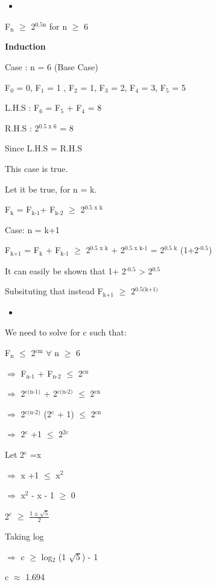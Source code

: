\documentclass{book}
\begin{document}
\section{}
\label{sec:org9c564a7}
\begin{itemize}
\item 
\end{itemize}
\begin{EQUATION}
F\(_{\text{n}}\) \(\ge\) 2\(^{\text{0.5n}}\) for n \(\ge\) 6

\textbf{Induction}

Case : n = 6 (Base Case)

F\(_{\text{0}}\) = 0, F\(_{\text{1}}\) = 1 , F\(_{\text{2}}\) = 1, F\(_{\text{3}}\) = 2, F\(_{\text{4}}\) = 3, F\(_{\text{5}}\) = 5

L.H.S : F\(_{\text{6}}\) = F\(_{\text{5}}\) + F\(_{\text{4}}\) = 8

R.H.S : 2\(^{\text{0.5 x 6}}\) = 8

Since L.H.S = R.H.S

This case is true.

Let it be true, for n = k.

F\(_{\text{k}}\) = F\(_{\text{k-1}}\)+ F\(_{\text{k-2}}\) \(\ge\) 2\(^{\text{0.5 x k}}\)

Case: n = k+1

F\(_{\text{k+1}}\) = F\(_{\text{k}}\) + F\(_{\text{k-1}}\) \(\ge\) 2\(^{\text{0.5 x k}}\) + 2\(^{\text{0.5 x k-1}}\)  = 2\(^{\text{0.5 k}}\) (1+2\(^{\text{-0.5}}\)) 

It can easily be shown that 1+ 2\(^{\text{-0.5}}\) > 2\(^{\text{0.5}}\)

Subsituting that instead
F\(_{\text{k+1}}\) \(\ge\) 2\(^{\text{0.5(k+1)}}\)
\end{EQUATION}
\begin{itemize}
\item 
\end{itemize}
\begin{EQUATION}
We need to solve for c such that:

F\(_{\text{n}}\) \(\le\) 2\(^{\text{cm}}\) \(\forall\) n \(\ge\) 6

\(\Rightarrow\) F\(_{\text{n-1}}\) + F\(_{\text{n-2}}\) \(\le\) 2\(^{\text{cn}}\)

\(\Rightarrow\) 2\(^{\text{c(n-1)}}\) + 2\(^{\text{c(n-2)}}\) \(\le\) 2\(^{\text{cn}}\)

\(\Rightarrow\) 2\(^{\text{c(n-2)}}\) (2\(^{\text{c}}\) + 1) \(\le\) 2\(^{\text{cn}}\)

\(\Rightarrow\) 2\(^{\text{c}}\) +1  \(\le\) 2\(^{\text{2c}}\)

Let 2\(^{\text{c}}\) =x

\(\Rightarrow\) x +1 \(\le\) x\(^{\text{2}}\)

\(\Rightarrow\) x\(^{\text{2}}\) - x - 1 \(\ge\) 0

2\(^{\text{c}}\) \(\ge\) \(\frac{1 \pm \sqrt{5}}{2}\) 

Taking log

\(\Rightarrow\) c  \(\ge\) log\(_{\text{2}}\) (1 \textpm{} \(\sqrt{5}\)) - 1

c \(\approx\) 1.694
\end{EQUATION}
\end{document}
